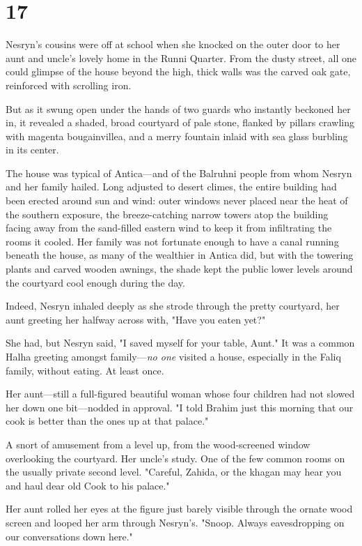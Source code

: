 
\chapter{17}

Nesryn's cousins were off at school when she knocked on the outer door to her aunt and uncle's lovely home in the Runni Quarter. From the dusty street, all one could glimpse of the house beyond the high, thick walls was the carved oak gate, reinforced with scrolling iron.

But as it swung open under the hands of two guards who instantly beckoned her in, it revealed a shaded, broad courtyard of pale stone, flanked by pillars crawling with magenta bougainvillea, and a merry fountain inlaid with sea glass burbling in its center.

The house was typical of Antica---and of the Balruhni people from whom Nesryn and her family hailed. Long adjusted to desert climes, the entire building had been erected around sun and wind: outer windows never placed near the heat of the southern exposure, the breeze-catching narrow towers atop the building facing away from the sand-filled eastern wind to keep it from infiltrating the rooms it cooled. Her family was not fortunate enough to have a canal running beneath the house, as many of the wealthier in Antica did, but with the towering plants and carved wooden awnings, the shade kept the public lower levels around the courtyard cool enough during the day.

Indeed, Nesryn inhaled deeply as she strode through the pretty courtyard, her aunt greeting her halfway across with, "Have you eaten yet?"

She had, but Nesryn said, "I saved myself for your table, Aunt." It was a common Halha greeting amongst family---\emph{no one} visited a house, especially in the Faliq family, without eating. At least once.

Her aunt---still a full-figured beautiful woman whose four children had not slowed her down one bit---nodded in approval. "I told Brahim just this morning that our cook is better than the ones up at that palace."

A snort of amusement from a level up, from the wood-screened window overlooking the courtyard. Her uncle's study. One of the few common rooms on the usually private second level. "Careful, Zahida, or the khagan may hear you and haul dear old Cook to his palace."

Her aunt rolled her eyes at the figure just barely visible through the ornate wood screen and looped her arm through Nesryn's. "Snoop. Always eavesdropping on our conversations down here."

